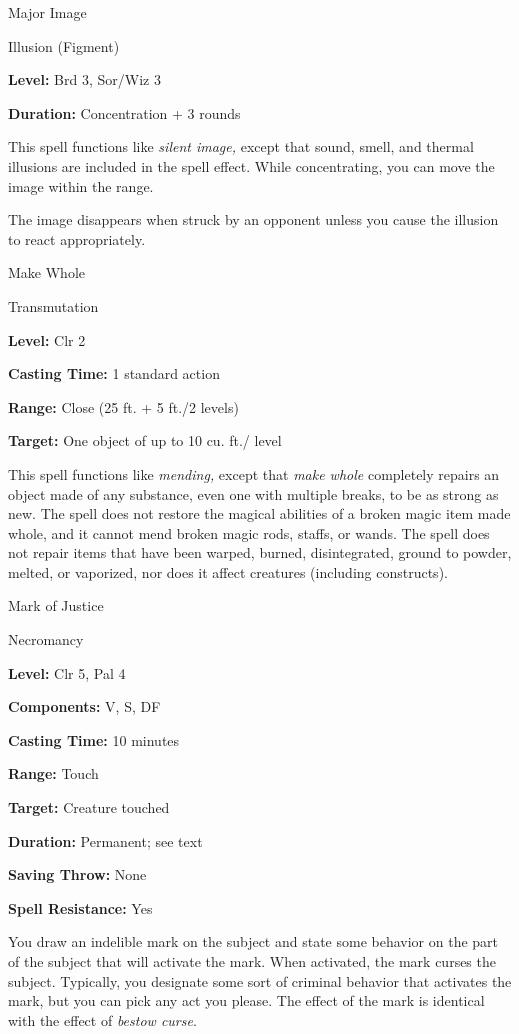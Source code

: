 \documentclass{article}
\begin{document}
\vspace{12pt}
Major Image

Illusion (Figment)

\textbf{Level:} Brd 3, Sor/Wiz 3

\textbf{Duration:} Concentration + 3 rounds

This spell functions like \textit{silent image, }except that sound, smell, and 
thermal illusions are included in the spell effect. While concentrating, you can 
move the image within the range. 

The image disappears when struck by an opponent unless you cause the illusion to 
react appropriately.

\vspace{12pt}
Make Whole

Transmutation

\textbf{Level:} Clr 2

\textbf{Casting Time:} 1 standard action

\textbf{Range:} Close (25 ft. + 5 ft./2 levels)

\textbf{Target:} One object of up to 10 cu. ft./ level

This spell functions like \textit{mending, }except that \textit{make whole }completely 
repairs an object made of any substance, even one with multiple breaks, to be as 
strong as new. The spell does not restore the magical abilities of a broken magic 
item made whole, and it cannot mend broken magic rods, staffs, or wands. The spell 
does not repair items that have been warped, burned, disintegrated, ground to powder, 
melted, or vaporized, nor does it affect creatures (including constructs).

\vspace{12pt}
Mark of Justice

Necromancy

\textbf{Level:} Clr 5, Pal 4

\textbf{Components:} V, S, DF

\textbf{Casting Time:} 10 minutes

\textbf{Range:} Touch

\textbf{Target:} Creature touched

\textbf{Duration:} Permanent; see text

\textbf{Saving Throw:} None

\textbf{Spell Resistance:} Yes

You draw an indelible mark on the subject and state some behavior on the part of 
the subject that will activate the mark. When activated, the mark curses the subject. 
Typically, you designate some sort of criminal behavior that activates the mark, 
but you can pick any act you please. The effect of the mark is identical with the 
effect of \textit{bestow curse}.
\end{document}
